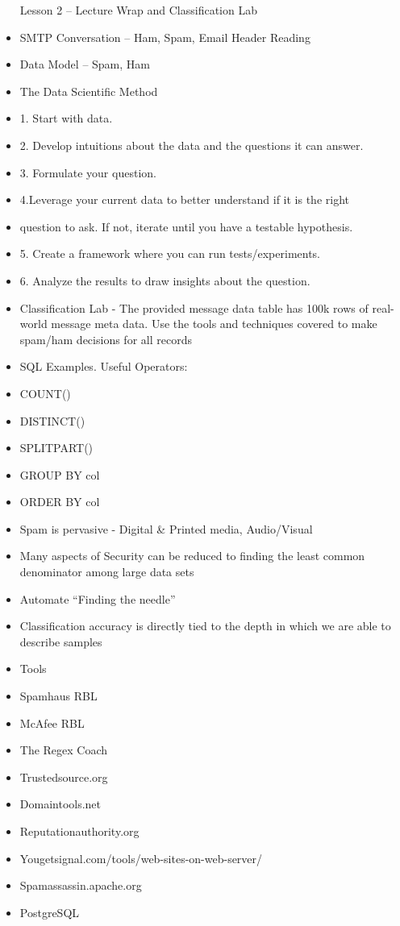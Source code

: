 \documentclass[12pt]{article}
\begin{document}
\begin{itemize}
Lesson 2 – Lecture Wrap and Classification Lab
\item SMTP Conversation – Ham, Spam, Email Header Reading
\item Data Model – Spam, Ham
\item The Data Scientific Method
\item 1. Start with data.
\item 2. Develop intuitions about the data and the questions it can answer.
\item 3. Formulate your question.
\item 4.Leverage your current data to better understand if it is the right
\item question to ask. If not, iterate until you have a testable hypothesis.
\item 5. Create a framework where you can run tests/experiments.
\item 6. Analyze the results to draw insights about the question.
\item Classification Lab - The provided message data table has 100k rows of real-world message meta data. Use the tools and techniques covered to make spam/ham decisions for all records
\item SQL Examples. Useful Operators:
\item COUNT()
\item DISTINCT()
\item SPLITPART()
\item GROUP BY col
\item ORDER BY col
\item Spam is pervasive - Digital & Printed media, Audio/Visual
\item Many aspects of Security can be reduced to finding the least common denominator among large data sets
\item Automate “Finding the needle”
\item Classification accuracy is directly tied to the depth in which we are able to describe samples
\item Tools
\item Spamhaus RBL
\item McAfee RBL
\item The Regex Coach
\item Trustedsource.org
\item Domaintools.net
\item Reputationauthority.org
\item Yougetsignal.com/tools/web-sites-on-web-server/
\item Spamassassin.apache.org
\item PostgreSQL

\end{itemize}
 
\end{document}
